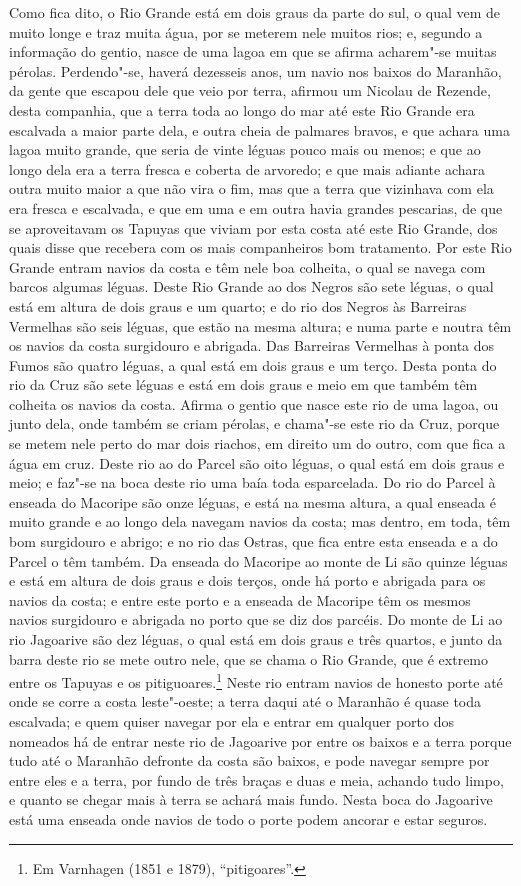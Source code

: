 Como fica dito, o Rio Grande está em dois graus da parte do sul, o qual vem de muito longe
e traz muita água, por se meterem nele muitos rios; e, segundo a informação do gentio,
nasce de uma lagoa em que se afirma acharem"-se muitas pérolas. Perdendo"-se, haverá
dezesseis anos, um navio nos baixos do Maranhão, da gente que escapou dele que veio por
terra, afirmou um Nicolau de Rezende, desta companhia, que a terra toda ao longo do mar
até este Rio Grande era escalvada a maior parte dela, e outra cheia de palmares bravos, e
que achara uma lagoa muito grande, que seria de vinte léguas pouco mais ou menos; e que ao
longo dela era a terra fresca e coberta de arvoredo; e que mais adiante achara outra muito
maior a que não vira o fim, mas que a terra que vizinhava com ela era fresca e escalvada,
e que em uma e em outra havia grandes pescarias, de que se aproveitavam os Tapuyas que
viviam por esta costa até este Rio Grande, dos quais disse que recebera com os mais
companheiros bom tratamento. Por este Rio Grande entram navios da costa e têm nele boa
colheita, o qual se navega com barcos algumas léguas. Deste Rio Grande ao dos Negros são
sete léguas, o qual está em altura de dois graus e um quarto; e do rio dos Negros às
Barreiras Vermelhas são seis léguas, que estão na mesma altura; e numa parte e noutra têm
os navios da costa surgidouro e abrigada. Das Barreiras Vermelhas à ponta dos Fumos são
quatro léguas, a qual está em dois graus e um terço. Desta ponta do rio da Cruz são sete
léguas e está em dois graus e meio em que também têm colheita os navios da costa. Afirma o
gentio que nasce este rio de uma lagoa, ou junto dela, onde também se criam pérolas, e
chama"-se este rio da Cruz, porque se metem nele perto do mar dois riachos, em direito um
do outro, com que fica a água em cruz. Deste rio ao do Parcel são oito léguas, o qual está
em dois graus e meio; e faz"-se na boca deste rio uma baía toda esparcelada. Do rio do
Parcel à enseada do Macoripe são onze léguas, e está na mesma altura, a qual enseada é
muito grande e ao longo dela navegam navios da costa; mas dentro, em toda, têm bom
surgidouro e abrigo; e no rio das Ostras, que fica entre esta enseada e a do Parcel o têm
também. Da enseada do Macoripe ao monte de Li são quinze léguas e está em altura de dois
graus e dois terços, onde há porto e abrigada para os navios da costa; e entre este porto
e a enseada de Macoripe têm os mesmos navios surgidouro e abrigada no porto que se diz dos
parcéis. Do monte de Li ao rio Jagoarive são dez léguas, o qual está em dois graus e três
quartos, e junto da barra deste rio se mete outro nele, que se chama o Rio Grande, que é
extremo entre os Tapuyas e os pitiguoares.\footnote{ Em Varnhagen (1851 e 1879),
``pitigoares''.} Neste rio entram navios de honesto porte até onde se corre a costa
leste"-oeste; a terra daqui até o Maranhão é quase toda escalvada; e quem quiser navegar
por ela e entrar em qualquer porto dos nomeados há de entrar neste rio de Jagoarive por
entre os baixos e a terra porque tudo até o Maranhão defronte da costa são baixos, e pode
navegar sempre por entre eles e a terra, por fundo de três braças e duas e meia, achando
tudo limpo, e quanto se chegar mais à terra se achará mais fundo. Nesta boca do Jagoarive
está uma enseada onde navios de todo o porte podem ancorar e estar seguros.

